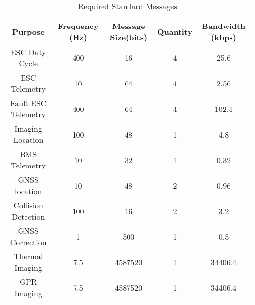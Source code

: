 \begin{table}[h]
\centering
\begin{tabular}{|c|c|c|c|c|} 
\hline
\textbf{Purpose}&\textbf{Frequency (Hz)}&\textbf{Message Size(bits)}&\textbf{Quantity}&\textbf{Bandwidth (kbps)}\\
\hline
ESC Duty Cycle&400&16&4&25.6\\
ESC Telemetry&10&64&4&2.56\\
Fault ESC Telemetry&400&64&4&102.4\\
Imaging Location&100&48&1&4.8\\
BMS Telemetry&10&32&1&0.32\\
GNSS location&10&48&2&0.96\\
Collision Detection&100&16&2&3.2\\
GNSS Correction&1&500&1&0.5\\
Thermal Imaging&7.5&4587520&1&34406.4\\
GPR Imaging&7.5&4587520&1&34406.4\\
\hline
\end{tabular}
\caption{Required Standard Messages}
\label{tab:messages}
\end{table}
